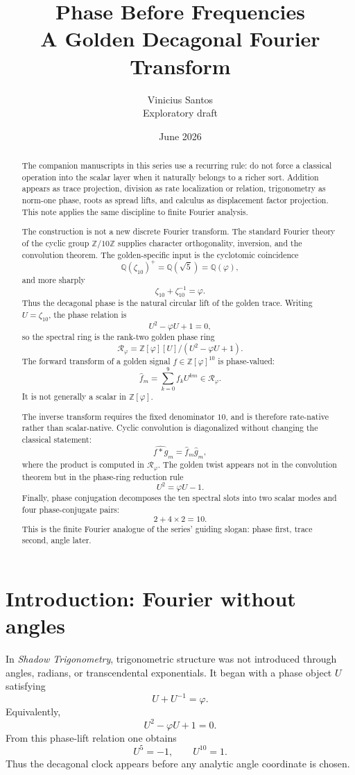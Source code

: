 \documentclass[11pt]{article}
\title{Phase Before Frequencies\\
\large A Golden Decagonal Fourier Transform}
\author{Vinicius Santos\\
\small Exploratory draft}
\date{June 2026}
\newcommand{\ph}{\varphi}
\newcommand{\Z}{\mathbb{Z}}
\newcommand{\Q}{\mathbb{Q}}
\newcommand{\RR}{\mathcal R_\ph}
\newcommand{\zz}{\zeta}
\begin{document}
\maketitle

\begin{abstract}
The companion manuscripts in this series use a recurring rule: do not force a classical operation into the scalar layer when it naturally belongs to a richer sort.  Addition appears as trace projection, division as rate localization or relation, trigonometry as norm-one phase, roots as spread lifts, and calculus as displacement factor projection.  This note applies the same discipline to finite Fourier analysis.

The construction is not a new discrete Fourier transform.  The standard Fourier theory of the cyclic group $\Z/10\Z$ supplies character orthogonality, inversion, and the convolution theorem.  The golden-specific input is the cyclotomic coincidence
\[
    \Q(\zz_{10})^+=\Q(\sqrt5)=\Q(\ph),
\]
and more sharply
\[
    \zz_{10}+\zz_{10}^{-1}=\ph.
\]
Thus the decagonal phase is the natural circular lift of the golden trace.  Writing $U=\zz_{10}$, the phase relation is
\[
    U^2-\ph U+1=0,
\]
so the spectral ring is the rank-two golden phase ring
\[
    \RR=\Z[\ph][U]/(U^2-\ph U+1).
\]
The forward transform of a golden signal $f\in\Z[\ph]^{10}$ is phase-valued:
\[
    \widehat f_m=\sum_{k=0}^9 f_kU^{km}\in\RR.
\]
It is not generally a scalar in $\Z[\ph]$.

The inverse transform requires the fixed denominator $10$, and is therefore rate-native rather than scalar-native.  Cyclic convolution is diagonalized without changing the classical statement:
\[
    \widehat{f*g}_m=\widehat f_m\widehat g_m,
\]
where the product is computed in $\RR$.  The golden twist appears not in the convolution theorem but in the phase-ring reduction rule
\[
    U^2=\ph U-1.
\]
Finally, phase conjugation decomposes the ten spectral slots into two scalar modes and four phase-conjugate pairs:
\[
    2+4\times 2=10.
\]
This is the finite Fourier analogue of the series' guiding slogan: phase first, trace second, angle later.
\end{abstract}

\tableofcontents

\section{Introduction: Fourier without angles}

In \emph{Shadow Trigonometry}, trigonometric structure was not introduced through angles, radians, or transcendental exponentials.  It began with a phase object $U$ satisfying
\[
    U+U^{-1}=\ph.
\]
Equivalently,
\[
    U^2-\ph U+1=0.
\]
From this phase-lift relation one obtains
\[
    U^5=-1,
    \qquad
    U^{10}=1.
\]
Thus the decagonal clock appears before any analytic angle coordinate is chosen.
\end{document}
